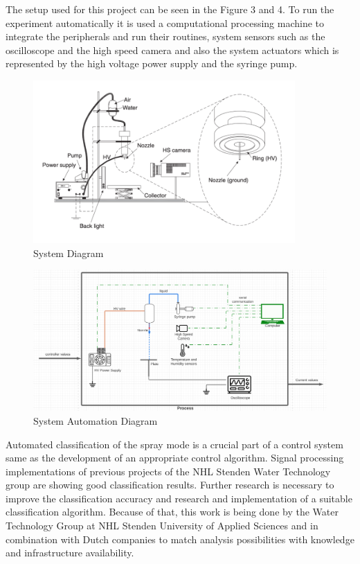 The setup used for this project can be seen in the Figure 3 and 4. To run the experiment automatically it is used a computational processing machine to integrate the peripherals and run their routines, system sensors such as the oscilloscope and the high speed camera 
and also the system actuators which is represented by the high voltage power supply and the syringe pump. 

\begin{figure}[H]
    \center
    \includegraphics[width=10cm]{images/system_setup.png}
    \caption{System Diagram}
\end{figure}

\begin{figure}[H]
    \center
    \includegraphics[width=14cm]{images/image_folder_report_4/new_system_setup.png}
    \caption{System Automation Diagram}
\end{figure}


Automated classification of the spray mode is a crucial part of a control system same as the development of an appropriate control algorithm. 
Signal processing implementations of previous projects of the NHL Stenden Water Technology group are showing good classification results.
Further research is necessary to improve the classification accuracy and research and implementation of a suitable classification algorithm. 
Because of that, this work is being done by the Water Technology Group at NHL Stenden University of Applied Sciences and in combination with Dutch companies to match analysis possibilities with knowledge and infrastructure availability.




